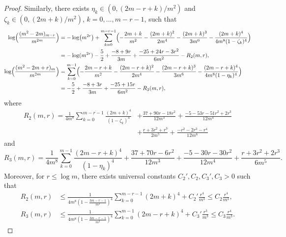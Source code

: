 \documentclass[11pt]{article}
\begin{document}
\begin{proof}
Similarly, there exists $\eta_k \in (0, (2m - r + k)/m^2)$ and $\zeta_k \in (0, (2m + k) / m^2)$, $k = 0, \ldots, m - r - 1$, such that 
\begin{align}
    \log \Bigl(\frac{(m^2 - 2m)_{m-r}}{m^{2m}}\Bigr) &= -\log \bigl(m^{2r}\bigr) + \sum_{k = 0}^{m - r - 1} \Bigl(-\frac{2m + k}{m^2}- \frac{(2m + k)^2}{2m^4} -\frac{(2m + k)^3}{3m^6} - \frac{(2m + k)^4}{4m^8(1 - \zeta_k)^4}\Bigr) \notag \\ 
    &= - \log(m^{2r}) - \frac{5}{2} + \frac{-8 + 9r}{3m} + \frac{-25 + 24 r - 3r^2}{6m^2} - R_2(m, r), \label{eq:R2Lagrangian}\\ 
    \log \Bigl(\frac{(m^2 - 2m + r)_m}{m^{2m}}\Bigr) &= \sum_{k = 0}^{m -1}\Bigl(-\frac{2m - r + k}{m^2} - \frac{(2m - r+k)^2}{2m^4} - \frac{(2m - r + k)^3}{3m^6} - \frac{(2m - r + k)^4}{4m^8(1 - \eta_k)^4}\Bigr) \notag \\ 
    &= -\frac{5}{2} + \frac{-8 + 3r}{3m} + \frac{-25 + 15 r}{6m^2} - R_3(m, r),\label{eq:R3Lagrangian}
\end{align}
where
\begin{align*}
    R_2(m, r) = \frac{1}{4m^8}\sum_{k = 0}^{m - r - 1}\frac{(2m + k)^4}{(1 -\zeta_k)^4} &+ \frac{37 + 90 r - 18 r^2}{12m^3} + \frac{-5 - 53 r - 51r^2 + 2r^3}{12 m^4} \\ 
    &+\frac{r+3r^2 + r^3}{2m^5} + \frac{-r^2 -2r^3-r^4}{12 m^6} 
\end{align*}
and 
\[
    R_3(m, r) = \frac{1}{4m^8}\sum_{k = 0}^{m - 1}\frac{(2m - r + k)^4}{(1 - \eta_k)^4} + \frac{37 + 70r- 6r^2}{12m^3} + \frac{-5-30 r-30 r^2}{12m^4} + \frac{r + 3r^2 + 2r^3}{6m^5}.
\]
Moreover, for $r \leq \log m$, there exists universal constants $C_2', C_2, C_3', C_3> 0$ such that
\begin{align}
    R_2(m, r) &\leq \frac{1}{4m^8(1 - \frac{3m -r -1}{m^2})^4}\sum_{k = 0}^{m - r -1}(2m + k)^4 + C_2'\frac{r^4}{m^3} \leq C_2 \frac{r^4}{m^3},  \label{eq:boundR_2} \\ 
        R_3(m, r) &\leq \frac{1}{4m^8(1 - \frac{3m - r - 1}{m^2})^4} \sum_{k = 0}^{m - 1} (2m -r + k)^4 + C_3'\frac{r^3}{m^3} \leq C_3\frac{r^4}{m^3}. \label{eq:boundR_3}
\end{align}


\end{proof}
\end{document}
